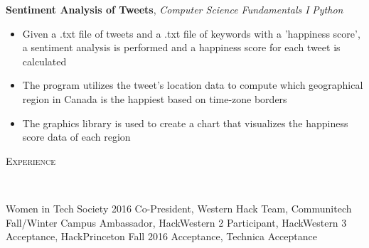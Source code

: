\documentclass[9pt]{article}
\newenvironment{changemargin}[2]{%
  \begin{list}{}{%
    \setlength{\topsep}{0pt}%
    \setlength{\leftmargin}{#1}%
    \setlength{\rightmargin}{#2}%
    \setlength{\listparindent}{\parindent}%
    \setlength{\itemindent}{\parindent}%
    \setlength{\parsep}{\parskip}%
  }%
  \item[]}{\end{list}
}
\newcommand{\lineover}{
	\begin{changemargin}{-0.05in}{-0.05in}
		\vspace*{-8pt}
		\hrulefill \\
		\vspace*{-2pt}
	\end{changemargin}
}
\newcommand{\header}[1]{
	\begin{changemargin}{-0.5in}{-0.5in}
		\scshape{#1}\\
  	\lineover
	\end{changemargin}
}
\newenvironment{body} {
	\vspace*{-16pt}
	\begin{changemargin}{-0.25in}{-0.5in}
  }	
	{\end{changemargin}
}
\begin{document}
\begin{body}
    \textbf{Sentiment Analysis of Tweets}, \emph{Computer Science Fundamentals I} \hfill \emph{Python}\\
	\begin{itemize} \itemsep -0pt  %
        \item Given a .txt file of tweets and a .txt file of keywords with a 'happiness score', a sentiment analysis is performed and a happiness score for each tweet is calculated
        \item The program utilizes the tweet's location data to compute which geographical region in Canada is the happiest based on time-zone borders
        \item The graphics library is used to create a chart that visualizes the happiness score data of each region
	\end{itemize}
\end{body}

\bigskip

\header{Experience}
\begin{body}
    \vspace{14pt}
    Women in Tech Society 2016 Co-President, Western Hack Team, Communitech Fall/Winter Campus Ambassador, HackWestern 2 Participant, HackWestern 3 Acceptance, HackPrinceton Fall 2016 Acceptance, Technica Acceptance
\end{body}
\end{document}
